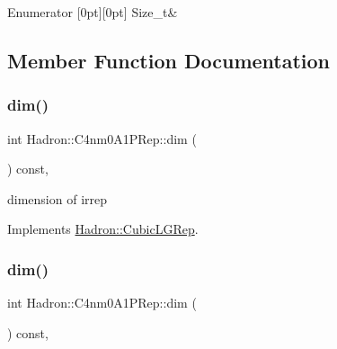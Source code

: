 \begin{DoxyEnumFields}{Enumerator}
[0pt][0pt]{}\mbox{\label{structHadron_1_1C4nm0A1PRep_a862494c4c132ab43c0a8aa863ab1c51fa23e5120d999498cc26a9c083a9da2917}} 
Size\+\_\+t&\\
\hline

\end{DoxyEnumFields}


\subsection{Member Function Documentation}
\mbox{\label{structHadron_1_1C4nm0A1PRep_aabd15e62bba41adfc55ddc92338d88e5}} 
\subsubsection{\texorpdfstring{dim()}{dim()}\hspace{0.1cm}{\footnotesize\ttfamily [1/3]}}
{\footnotesize\ttfamily int Hadron\+::\+C4nm0\+A1\+P\+Rep\+::dim (\begin{DoxyParamCaption}{ }\end{DoxyParamCaption}) const\hspace{0.3cm}{\ttfamily [inline]}, {\ttfamily [virtual]}}

dimension of irrep 

Implements \mbox{\hyperlink{structHadron_1_1CubicLGRep_a3acbaea26503ed64f20df693a48e4cdd}{Hadron\+::\+Cubic\+L\+G\+Rep}}.

\mbox{\label{structHadron_1_1C4nm0A1PRep_aabd15e62bba41adfc55ddc92338d88e5}} 
\subsubsection{\texorpdfstring{dim()}{dim()}\hspace{0.1cm}{\footnotesize\ttfamily [2/3]}}
{\footnotesize\ttfamily int Hadron\+::\+C4nm0\+A1\+P\+Rep\+::dim (\begin{DoxyParamCaption}{ }\end{DoxyParamCaption}) const\hspace{0.3cm}{\ttfamily [inline]}, {\ttfamily [virtual]}}

